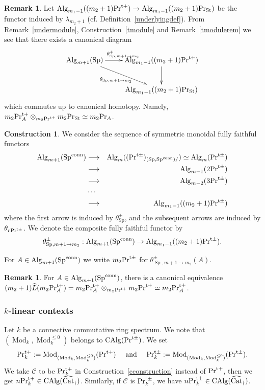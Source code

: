 \documentclass[leqno,12pt]{amsart}
\theoremstyle{plain}
\theoremstyle{definition}
\newtheorem{Remark}[Theorem]{Remark}
\newtheorem{Construction}[Theorem]{Construction}
\newcommand{\CCC}{\mathcal{C}}
\newcommand{\PR}{\textup{Pr}}
\newcommand{\PRTT}{\textup{Pr}^{\textup{t}+}}
\newcommand{\PRTTT}{\textup{Pr}^{\textup{t}\pm}}
\newcommand{\SP}{\operatorname{Sp}}
\newcommand{\SPC}{\operatorname{Sp}^{\textup{conn}}}
\newcommand{\Mod}{\operatorname{Mod}}
\newcommand{\Alg}{\operatorname{Alg}}
\newcommand{\CAlg}{\operatorname{CAlg}}
\newcommand{\vCat}{\widehat{\operatorname{Cat}}_\dagger}
\newcommand{\PRST}{\PR_{\textup{St}}}
\begin{document}
\begin{Remark}
Let $\Alg_{m_1-1}((m_2+1)\PRTT) \to \Alg_{m_1-1}((m_2+1)\PRST)$ be the functor induced by $\lambda_{m_2+1}$ (cf. Definition~\ref{underlyingdef}).
From Remark~\ref{undermodule}, Construction~\ref{tmodule} and Remark~\ref{tmodulerem}
we see that there exists a canonical diagram
\[
\xymatrix{
\Alg_{m+1}(\SP)\ar[r]^{\theta^+_{\SP,m+1\to m_2}} \ar[rd]_{\theta_{\SP,m+1\to m_2}} &  \Alg_{m_1-1}((m_2+1)\PRTT) \ar[d] \\
  &  \Alg_{m_1-1}((m_2+1)\PRST)
}
\]
which commutes up to canonical homotopy. Namely, $m_2\PRTT_A\otimes_{m_2\PRTT}m_2\PRST\simeq m_2\PR_A$.
\end{Remark}

\begin{Construction}
\label{thetaconst2}
We consider the sequence of symmetric monoidal fully faithful functors
\begin{eqnarray*}
\Alg_{m+1}(\SPC)  &\longrightarrow&  \Alg_{m}((\PRTTT)_{(\SP,\SPC)/})\simeq \Alg_{m}(\PRTTT) \\
 &\longrightarrow&  \Alg_{m-1}(2\PRTTT) \\
&\longrightarrow&  \Alg_{m-2}(3\PRTTT) \\
&\cdots& \\
&\longrightarrow&   \Alg_{m_1-1}((m_2+1)\PRTTT)
\end{eqnarray*}
where the first arrow is induced by $\theta_{\SP}^\pm$, and the subsequent arrows are induced by $\theta_{r\PRTTT}$.
We denote the composite fully faithful functor by 
\[
\theta^\pm_{\SP,m+1\to m_2}:\Alg_{m+1}(\SPC)\to \Alg_{m_1-1}((m_2+1)\PRTTT).
\]

For  $A\in \Alg_{m+1}(\SPC)$ we write $m_2\PRTTT$ for $\theta_{\SP,m+1\to m_2}^{\pm}(A)$.
\end{Construction}


\begin{Remark}
For $A\in \Alg_{m+1}(\SPC)$, there is a canonical equivalence $(m_2+1)\widehat{L}(m_2\PRTT_A)=m_2\PRTT_A\otimes_{m_2\PRTT}m_2\PRTTT\simeq m_2\PRTTT_A$.
\end{Remark}

\subsubsection{$k$-linear contexts}
Let $k$ be a connective commutative ring spectrum.
We note that $(\Mod_k, \Mod_k^{\le0})$ belongs to 
$\CAlg(\PRTTT)$.
We set 
\[
\PRTT_k:=\Mod_{(\Mod_k,\Mod_k^{\le0})}(\PRTT)\ \ \ \  \textup{and}\ \ \ \  \PRTTT_k:=\Mod_{(\Mod_k,\Mod_k^{\le0})}(\PRTTT).
\]
We take $\CCC$ to be $\PRTT_k$ in Construction~\ref{cconstruction} instead of $\PRTT$,
then we get $n\PRTT_k\in\CAlg(\vCat)$. Similarly, if $\CCC$ is $\PRTTT_k$, we have $n\PRTTT_k\in\CAlg(\vCat)$.
\end{document}
